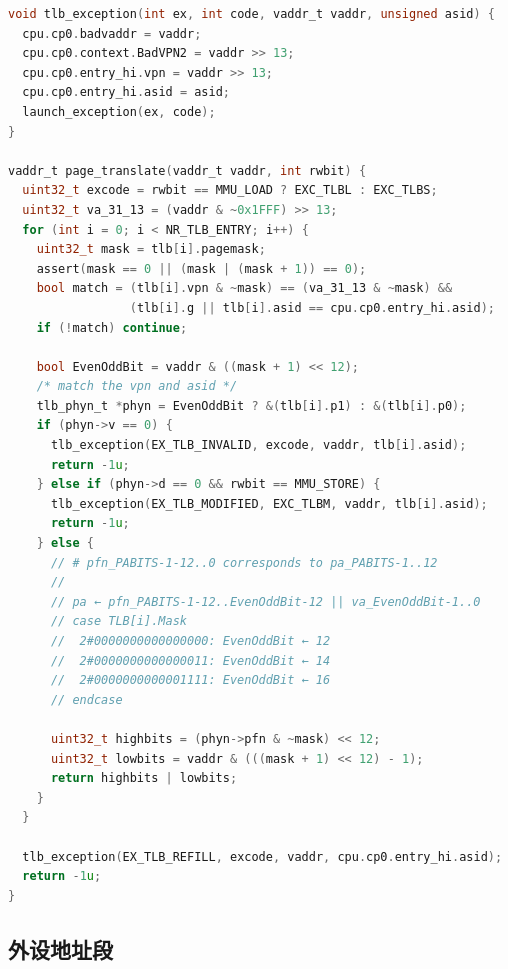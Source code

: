 \documentclass[lang=cn,11pt,a4paper]{elegantpaper}
\begin{document}
\begin{lstlisting}[language=c]
void tlb_exception(int ex, int code, vaddr_t vaddr, unsigned asid) {
  cpu.cp0.badvaddr = vaddr;
  cpu.cp0.context.BadVPN2 = vaddr >> 13;
  cpu.cp0.entry_hi.vpn = vaddr >> 13;
  cpu.cp0.entry_hi.asid = asid;
  launch_exception(ex, code);
}

vaddr_t page_translate(vaddr_t vaddr, int rwbit) {
  uint32_t excode = rwbit == MMU_LOAD ? EXC_TLBL : EXC_TLBS;
  uint32_t va_31_13 = (vaddr & ~0x1FFF) >> 13;
  for (int i = 0; i < NR_TLB_ENTRY; i++) {
    uint32_t mask = tlb[i].pagemask;
    assert(mask == 0 || (mask | (mask + 1)) == 0);
    bool match = (tlb[i].vpn & ~mask) == (va_31_13 & ~mask) &&
                 (tlb[i].g || tlb[i].asid == cpu.cp0.entry_hi.asid);
    if (!match) continue;

    bool EvenOddBit = vaddr & ((mask + 1) << 12);
    /* match the vpn and asid */
    tlb_phyn_t *phyn = EvenOddBit ? &(tlb[i].p1) : &(tlb[i].p0);
    if (phyn->v == 0) {
      tlb_exception(EX_TLB_INVALID, excode, vaddr, tlb[i].asid);
      return -1u;
    } else if (phyn->d == 0 && rwbit == MMU_STORE) {
      tlb_exception(EX_TLB_MODIFIED, EXC_TLBM, vaddr, tlb[i].asid);
      return -1u;
    } else {
      // # pfn_PABITS-1-12..0 corresponds to pa_PABITS-1..12
      //
      // pa ← pfn_PABITS-1-12..EvenOddBit-12 || va_EvenOddBit-1..0
      // case TLB[i].Mask
      //  2#0000000000000000: EvenOddBit ← 12
      //  2#0000000000000011: EvenOddBit ← 14
      //  2#0000000000001111: EvenOddBit ← 16
      // endcase

      uint32_t highbits = (phyn->pfn & ~mask) << 12;
      uint32_t lowbits = vaddr & (((mask + 1) << 12) - 1);
      return highbits | lowbits;
    }
  }

  tlb_exception(EX_TLB_REFILL, excode, vaddr, cpu.cp0.entry_hi.asid);
  return -1u;
}
\end{lstlisting}

\subsection{外设地址段}
\end{document}

